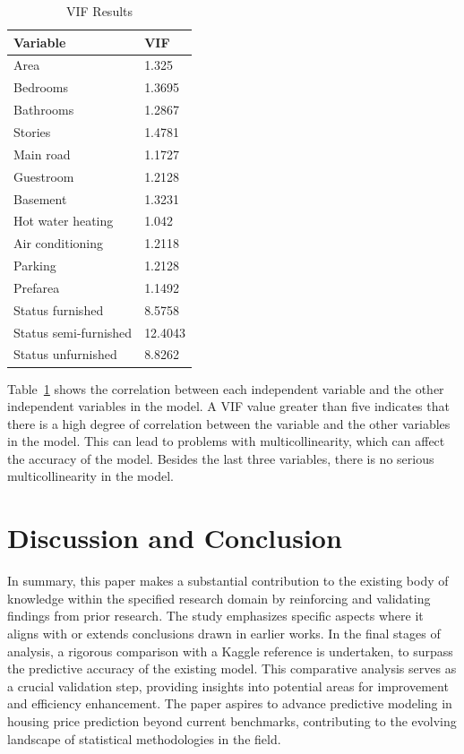 \documentclass[12pt]{article}
\begin{document}
\begin{table}[h!]
\caption{VIF Results}
  \label{tab:re}
 \begin{center} 
\begin{tabular}{ll}
  \toprule
Variable & VIF \\
  \midrule
Area & 1.325 \\ 
Bedrooms & 1.3695 \\
Bathrooms & 1.2867 \\
Stories & 1.4781 \\
Main road & 1.1727 \\
Guestroom & 1.2128 \\
Basement & 1.3231 \\
Hot water heating & 1.042 \\
Air conditioning & 1.2118 \\
Parking & 1.2128 \\
Prefarea & 1.1492 \\
Status furnished & 8.5758 \\
Status semi-furnished & 12.4043 \\
Status unfurnished & 8.8262 \\
   \bottomrule
\end{tabular}\par
\end{center}
\end{table}

Table~\ref{tab:re} shows the correlation between each independent variable and the other independent variables in the model. A VIF value greater than five indicates that there is a high degree of correlation between the variable and the other variables in the model. This can lead to problems with multicollinearity, which can affect the accuracy of the model. Besides the last three variables, there is no serious multicollinearity in the model. 

\section{Discussion and Conclusion}
\label{sec:disc}

In summary, this paper makes a substantial contribution to the existing body of knowledge within the specified research domain by reinforcing and validating findings from prior research. The study emphasizes specific aspects where it aligns with or extends conclusions drawn in earlier works. In the final stages of analysis, a rigorous comparison with a Kaggle reference is undertaken, to surpass the predictive accuracy of the existing model. This comparative analysis serves as a crucial validation step, providing insights into potential areas for improvement and efficiency enhancement. The paper aspires to advance predictive modeling in housing price prediction beyond current benchmarks, contributing to the evolving landscape of statistical methodologies in the field.
\end{document}
